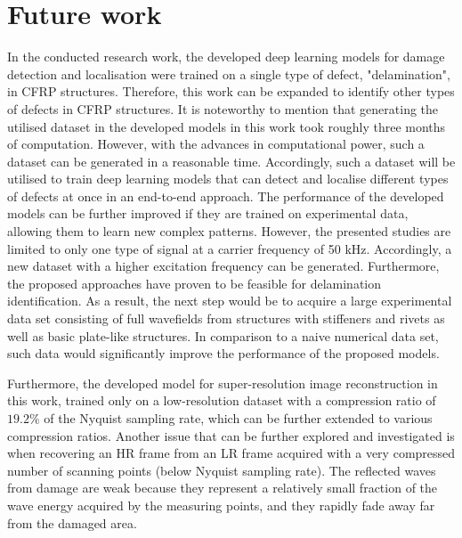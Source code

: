 \section{Future work}
\label{sec62}

In the conducted research work, the developed deep learning models for damage detection and localisation were trained on a single type of defect, "delamination", in CFRP structures.
Therefore, this work can be expanded to identify other types of defects in CFRP structures.
It is noteworthy to mention that generating the utilised dataset in the developed models in this work took roughly three months of computation.
However, with the advances in computational power, such a dataset can be generated in a reasonable time.
Accordingly, such a dataset will be utilised to train deep learning models that can detect and localise different types of defects at once in an end-to-end approach.
The performance of the developed models can be further improved if they are trained on experimental data, allowing them to learn new complex patterns.
However, the presented studies are limited to only one type of signal at a carrier frequency of 50 kHz.
Accordingly, a new dataset with a higher excitation frequency can be generated.
Furthermore, the proposed approaches have proven to be feasible for delamination identification.
As a result, the next step would be to acquire a large experimental data set consisting of full wavefields from structures with stiffeners and rivets as well as basic plate-like structures.
In comparison to a naive numerical data set, such data would significantly improve the performance of the proposed models.

Furthermore, the developed model for super-resolution image reconstruction in this work, trained only on a low-resolution dataset with a compression ratio of $19.2\%$ of the Nyquist sampling rate, which can be further extended to various compression ratios.
Another issue that can be further explored and investigated is when recovering an HR frame from an LR frame acquired with a very compressed number of scanning points (below Nyquist sampling rate). 
The reflected waves from damage are weak because they represent a relatively small fraction of the wave energy acquired by the measuring points, and they rapidly fade away far from the damaged area.





